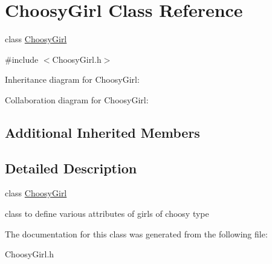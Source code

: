 \hypertarget{classChoosyGirl}{}\section{Choosy\+Girl Class Reference}
\label{classChoosyGirl}


class \hyperlink{classChoosyGirl}{Choosy\+Girl}  




{\ttfamily \#include $<$Choosy\+Girl.\+h$>$}



Inheritance diagram for Choosy\+Girl\+:


Collaboration diagram for Choosy\+Girl\+:
\subsection*{Additional Inherited Members}


\subsection{Detailed Description}
class \hyperlink{classChoosyGirl}{Choosy\+Girl} 

class to define various attributes of girls of choosy type 

The documentation for this class was generated from the following file\+:\begin{DoxyCompactItemize}
\item 
Choosy\+Girl.\+h\end{DoxyCompactItemize}
